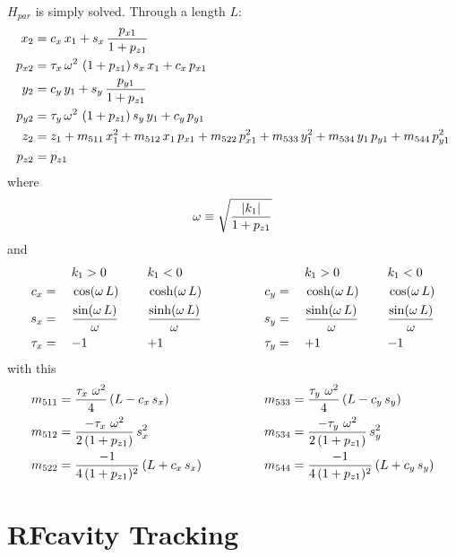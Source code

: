$H_{par}$ is simply solved. Through a length $L$:
\begin{align}
  x_2    &= c_x \, x_1 + s_x \, \frac{p_{x1}}{1 + p_{z1}} \nonumber \\
  p_{x2} &= \tau_x \, \omega^2 \, \, (1 + p_{z1}) \, s_x \, x_1 + c_x \, p_{x1} \nonumber \\
  y_2    &= c_y \, y_1 + s_y \, \frac{p_{y1}}{1 + p_{z1}} \nonumber \\
  p_{y2} &= \tau_y \, \omega^2 \, \, (1 + p_{z1}) \, s_y \, y_1 + c_y \, p_{y1} \\
  z_2    &= z_1 + m_{511} \, x_1^2 + m_{512} \, x_1 \, p_{x1} + m_{522} \, p_{x1}^2 + 
                   m_{533} \, y_1^2 + m_{534} \, y_1 \, p_{y1} + m_{544} \, p_{y1}^2 \nonumber \\
  p_{z2} &= p_{z1} \nonumber
\end{align}
where 
\begin{equation}
  \omega \equiv \sqrt{\frac{|k_1|}{1 + p_{z1}}}
\end{equation}
and
\begin{alignat}{6}
         &\hspace*{3ex}  && k_1 > 0          &\hspace*{3ex}& k_1 < 0 & \qquad \qquad
         &\hspace*{3ex}  && k_1 > 0          &\hspace*{3ex}& k_1 < 0 \nonumber \\
     c_x &=   && \cos  (\omega \, L) && \cosh (\omega \, L) & \qquad \qquad
     c_y &=   && \cosh (\omega \, L) && \cos  (\omega \, L) \nonumber \\
     s_x &=   && \frac{\sin  (\omega \, L)}{\omega} && \frac{\sinh (\omega \, L)}{\omega} & \qquad \qquad
     s_y &=   && \frac{\sinh (\omega \, L)}{\omega} && \frac{\sin  (\omega \, L)}{\omega} \\
  \tau_x &=   && {-}1             && {+}1             & \qquad \qquad
  \tau_y &=   && {+}1             && {-}1             \nonumber
\end{alignat}
with this
\begin{alignat}{2}
  m_{511} &= \frac{\tau_x \,\, \omega^2}{4} \, (L - c_x \, s_x) & \qquad \qquad
  m_{533} &= \frac{\tau_y \,\, \omega^2}{4} \, (L - c_y \, s_y) \nonumber \\
  m_{512} &= \frac{-\tau_x \,\, \omega^2}{2 \, (1 + p_{z1})} \, s_x^2 & \qquad \qquad
  m_{534} &= \frac{-\tau_y \,\, \omega^2}{2 \, (1 + p_{z1})} \, s_y^2 \\
  m_{522} &= \frac{-1}{4 \, (1 + p_{z1})^2} \, (L + c_x \, s_x) & \qquad \qquad
  m_{544} &= \frac{-1}{4 \, (1 + p_{z1})^2} \, (L + c_y \, s_y) \nonumber
\end{alignat}

\section{RFcavity Tracking}
\label{s:rfcavity.std}


